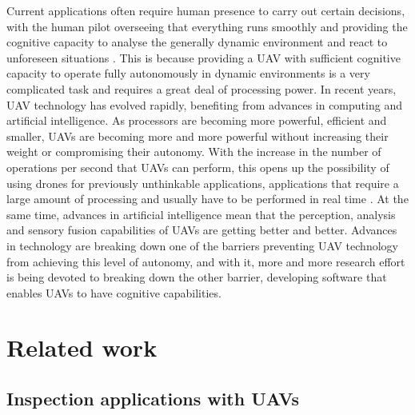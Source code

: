 Current applications often require human presence to carry out certain decisions, with the human pilot overseeing that everything runs smoothly and providing the cognitive capacity to analyse the generally dynamic environment and react to unforeseen situations \cite{kopeikin2012flight, }. This is because providing a \gls{UAV} with sufficient cognitive capacity to operate fully autonomously in dynamic environments is a very complicated task and requires a great deal of processing power. In recent years, \gls{UAV} technology has evolved rapidly, benefiting from advances in computing and artificial intelligence. As processors are becoming more powerful, efficient and smaller, \glspl{UAV} are becoming more and more powerful without increasing their weight or compromising their autonomy. With the increase in the number of operations per second that \glspl{UAV} can perform, this opens up the possibility of using drones for previously unthinkable applications, applications that require a large amount of processing and usually have to be performed in real time \cite{CivilAplications, shakeri2019design}. At the same time, advances in artificial intelligence mean that the perception, analysis and sensory fusion capabilities of \glspl{UAV} are getting better and better. Advances in technology are breaking down one of the barriers preventing \gls{UAV} technology from achieving this level of autonomy, and with it, more and more research effort is being devoted to breaking down the other barrier, developing software that enables \glspl{UAV} to have cognitive capabilities.



\section{Related work}
\label{sec:RelatedWork}

\subsection{Inspection applications with UAVs}
\label{subsec:InspectionApplicationsWithUAVs}

